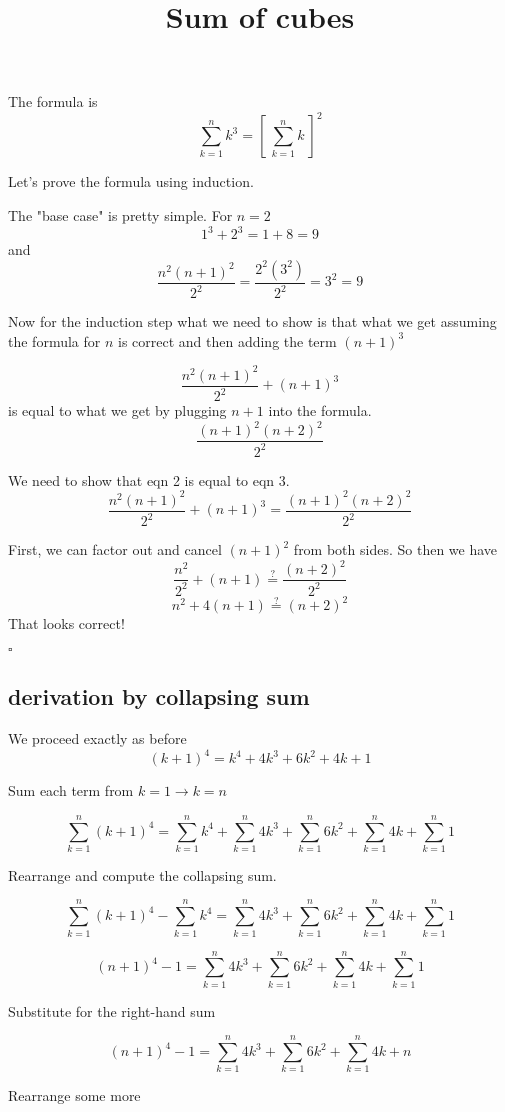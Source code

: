 \documentclass[11pt, oneside]{article}
\title{Sum of cubes}
\date{}
\begin{document}
\maketitle
\Large

The formula is
\[ \sum\limits_{k=1}^n k^3 = [ \ \sum\limits_{k=1}^n k \ ] ^2 \]

Let's prove the formula using induction.

The "base case" is pretty simple.  For $n=2$
\[ 1^3 + 2^3 = 1 + 8 = 9 \]
and
\[ \frac{n^2(n+1)^2}{2^2} = \frac{2^2(3^2)}{2^2} = 3^2 = 9 \]

Now for the induction step what we need to show is that what we get assuming the formula for $n$ is correct and then adding the term $(n+1)^3$

\[ \frac{n^2(n+1)^2}{2^2} + (n+1)^3 \]
is equal to what we get by plugging $n+1$ into the formula.
\[ \frac{(n+1)^2(n+2)^2}{2^2} \]

We need to show that eqn 2 is equal to eqn 3.  
\[ \frac{n^2(n+1)^2}{2^2} + (n+1)^3 = \frac{(n+1)^2(n+2)^2}{2^2} \]

First, we can factor out and cancel $(n+1)^2$ from both sides.  So then we have
\[ \frac{n^2}{2^2} + (n+1) \stackrel{?}{=} \frac{(n+2)^2}{2^2} \]
\[ n^2 + 4(n+1) \stackrel{?}{=} (n+2)^2 \]
That looks correct!

$\square$

\subsection*{derivation by collapsing sum}

We proceed exactly as before
\[ (k+1)^4 = k^4 + 4k^3 + 6k^2 + 4k + 1 \]

Sum each term from $k=1 \rightarrow k=n$

\[ \sum_{k=1}^n (k+1)^4 = \sum_{k=1}^n k^4 + \sum_{k=1}^n 4k^3 + \sum_{k=1}^n 6k^2 + \sum_{k=1}^n 4k + \sum_{k=1}^n 1 \]

Rearrange and compute the collapsing sum.

\[ \sum_{k=1}^n (k+1)^4 - \sum_{k=1}^n k^4 = \sum_{k=1}^n 4k^3 + \sum_{k=1}^n 6k^2 + \sum_{k=1}^n 4k + \sum_{k=1}^n 1 \]

\[ (n+1)^4 - 1 = \sum_{k=1}^n 4k^3 + \sum_{k=1}^n 6k^2 + \sum_{k=1}^n 4k + \sum_{k=1}^n 1 \]

Substitute for the right-hand sum

\[ (n+1)^4 - 1 = \sum_{k=1}^n 4k^3 + \sum_{k=1}^n 6k^2 + \sum_{k=1}^n 4k + n \]

Rearrange some more
\end{document}
